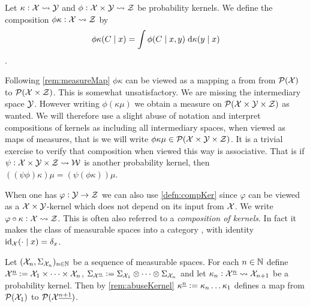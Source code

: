 \begin{defn}
  Let $\kappa : \mathcal{X} \leadsto \mathcal{Y}$ and
  $\phi : \mathcal{X} \times \mathcal{Y} \leadsto \mathcal{Z}$ be probability kernels.
  We define the composition $\phi \kappa : \mathcal{X} \leadsto \mathcal{Z}$ by
  \[ \phi \kappa(C \mid x) = \int \phi(C \mid x, y) \; \mathrm{d} \kappa(y \mid x) \]
  \label{defn:compKer}.
\end{defn}

\begin{rem}
  Following \cref{rem:measureMap} $\phi \kappa$ can be viewed as a mapping
  a from from $\mathcal{P}(\mathcal{X})$ to $\mathcal{P}(\mathcal{X}\times\mathcal{Z})$. This is
  somewhat unsatisfactory. We are missing the intermediary space $\mathcal{Y}$.
  However writing $\phi(\kappa \mu)$ we obtain a measure on
  $\mathcal{P}(\mathcal{X} \times \mathcal{Y} \times \mathcal{Z})$ as wanted.
  We will therefore use a slight abuse of notation and interpret compositions
  of kernels as including all intermediary spaces,
  when viewed as maps of measures, that is we will write
  $\phi\kappa\mu \in \mathcal{P}(\mathcal{X} \times \mathcal{Y} \times \mathcal{Z})$.
  It is a trivial exercise to verify that composition when viewed this way
  is associative. That is if $\psi : \mathcal{X} \times \mathcal{Y} \times \mathcal{Z}
  \leadsto \mathcal{W}$
  is another probability kernel, then
  $((\psi \phi) \kappa) \mu = (\psi (\phi \kappa)) \mu$.
  \label{rem:abuseKernel}
\end{rem}

\begin{rem}
  When one has $\varphi:\mathcal{Y} \to \mathcal{Z}$ we can also use \cref{defn:compKer}
  since $\varphi$ can be viewed as a $\mathcal{X}\times\mathcal{Y}$-kernel which does
  not depend on its input from $\mathcal{X}$.
  We write $\varphi \circ \kappa : \mathcal{X} \leadsto \mathcal{Z}$.
  This is often also referred to a \emph{composition of kernels}.
  In fact it makes the class of measurable spaces
  into a category ,
  with identity $\text{id}_{\mathcal{X}}(\cdot \mid x) = \delta_x$.
\end{rem}

\begin{rem}
  Let $(\mathcal{X}_n, \Sigma_{\mathcal{X}_n})_{n \in \mathbb{N}}$ be a sequence
  of measurable spaces. For each $n \in \mathbb{N}$ define
  $\mathcal{X}^{\underline{n}} \vcentcolon= \mathcal{X}_1 \times \dots \times \mathcal{X}_n$,
  $\Sigma_{\mathcal{X}^{\underline{n}}} \vcentcolon= \Sigma_{\mathcal{X}_1} \otimes
  \dots \otimes \Sigma_{\mathcal{X}_n}$
  and let
  $\kappa_n : \mathcal{X}^{\underline{n}} \leadsto \mathcal{X}_{n+1}$ be a probability kernel.
  Then by \cref{rem:abuseKernel}
  $\kappa^{\underline{n}} \vcentcolon= \kappa_n \dots \kappa_1$ defines a map
  from $\mathcal{P}(\mathcal{X}_1)$ to $\mathcal{P}(\mathcal{X}^{\underline{n+1}})$.
\end{rem}

